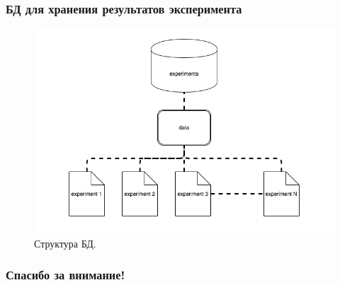 \documentclass[10pt,utf8,presentation,compress]{beamer}
\begin{document}
\begin{frame}
\frametitle{БД для хранения результатов эксперимента}
	\begin{figure}[H]
		\centering
		\includegraphics[width=0.8\linewidth]{images/database}
		\caption{Структура БД.}
	\end{figure}
\end{frame}

\begin{frame}[c]
\begin{center}
\frametitle{\LARGE Спасибо за внимание!}

{\LARGE \inserttitle}

\bigskip

{\insertauthor} 

\bigskip\bigskip

{\insertinstitute}

\bigskip\bigskip

{\large \insertdate}
\end{center}
\end{frame}
\end{document}
